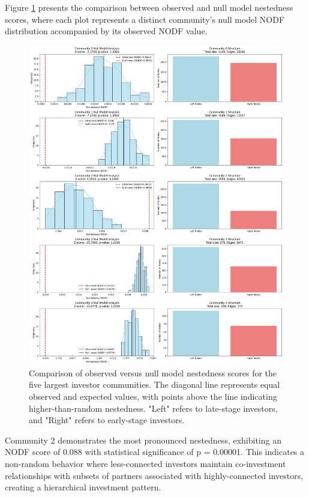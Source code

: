 Figure \ref{fig:nestedness_comparison} presents the comparison between observed and null model nestedness scores, where each plot represents a distinct community's null model NODF distribution accompanied by its observed NODF value.

\begin{figure}[htp]
\centering
\includegraphics[width=1\textwidth]{./assets/null-model-analysis-top-5.png}
\caption{Comparison of observed versus null model nestedness scores for the five largest investor communities. The diagonal line represents equal observed and expected values, with points above the line indicating higher-than-random nestedness. "Left" refers to late-stage investors, and "Right" refers to early-stage investors.}
\label{fig:nestedness_comparison}
\end{figure}

\newcommand{\interestingCommunity}{2}
\newcommand{\interestingCommunityNODF}{0.088}
\newcommand{\interestingCommunityPValue}{0.00001}

Community \interestingCommunity{} demonstrates the most pronounced nestedness, exhibiting an NODF score of \interestingCommunityNODF{} with statistical significance of p = \interestingCommunityPValue{}. This indicates a non-random behavior where less-connected investors maintain co-investment relationships with subsets of partners associated with highly-connected investors, creating a hierarchical investment pattern.

